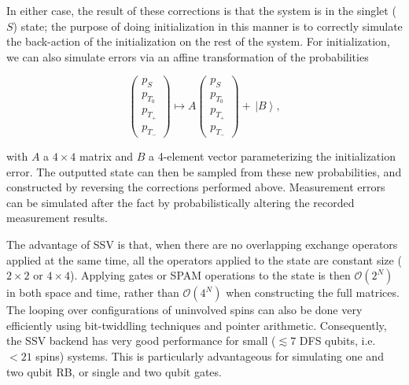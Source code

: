 \documentclass[aps,prl,twocolumn,superscriptaddress,nobibnotes,10pt,floatfix]{revtex4-2}
\begin{document}
In either case, the result of these corrections is that the system is in the singlet (\(S\)) state; the purpose of doing initialization in this manner is to correctly simulate the back-action of the initialization on the rest of the system.
For initialization, we can also simulate errors via an affine transformation of the probabilities

\begin{equation}
	\begin{pmatrix}
		p_{S} \\
		p_{T_{0}} \\
		p_{T_{+}} \\
		p_{T_{-}}
	\end{pmatrix} \mapsto A\begin{pmatrix}
		p_{S} \\
		p_{T_{0}} \\
		p_{T_{+}} \\
		p_{T_{-}}
	\end{pmatrix} + \,\left| B \right\rangle,
\end{equation}

with \(A\) a \(4 \times 4\) matrix and \(B\) a 4-element vector parameterizing the initialization error.
The outputted state can then be sampled from these new probabilities, and constructed by reversing the corrections performed above.
Measurement errors can be simulated after the fact by probabilistically altering the recorded measurement results.

The advantage of SSV is that, when there are no overlapping exchange operators applied at the same time, all the operators applied to the state are constant size (\(2 \times 2\) or \(4 \times 4\)).
Applying gates or SPAM operations to the state is then \(\mathcal{O}\left( 2^{N} \right)\) in both space and time, rather than \(\mathcal{O}\left( 4^{N} \right)\) when constructing the full matrices.
The looping over configurations of uninvolved spins can also be done very efficiently using bit-twiddling techniques and pointer arithmetic.
Consequently, the SSV backend has very good performance for small (\(\lesssim 7\) DFS qubits, i.e. \(< 21\) spins) systems.
This is particularly advantageous for simulating one and two qubit RB, or single and two qubit gates.
\end{document}
